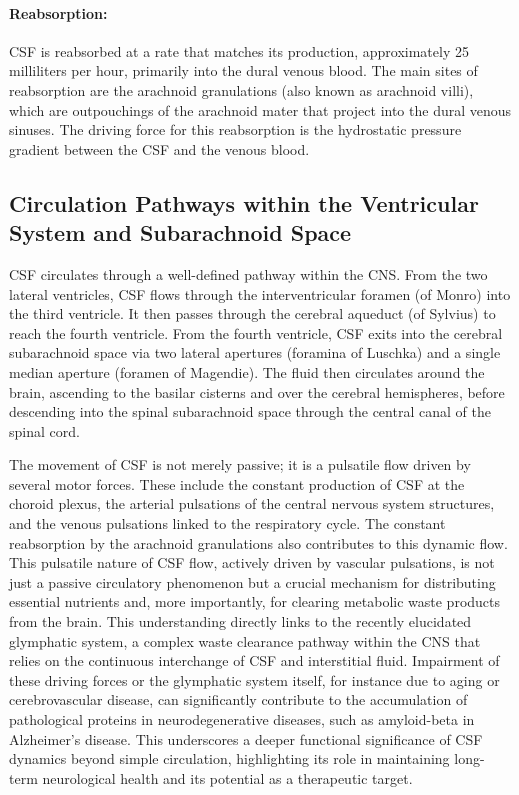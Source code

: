 \paragraph{Reabsorption:} CSF is reabsorbed at a rate that matches its production, approximately 25 milliliters per hour, primarily into the dural venous blood. The main sites of reabsorption are the arachnoid granulations (also known as arachnoid villi), which are outpouchings of the arachnoid mater that project into the dural venous sinuses. The driving force for this reabsorption is the hydrostatic pressure gradient between the CSF and the venous blood.
	
\subsection{Circulation Pathways within the Ventricular System and Subarachnoid Space}
	
CSF circulates through a well-defined pathway within the CNS. From the two lateral ventricles, CSF flows through the interventricular foramen (of Monro) into the third ventricle. It then passes through the cerebral aqueduct (of Sylvius) to reach the fourth ventricle. From the fourth ventricle, CSF exits into the cerebral subarachnoid space via two lateral apertures (foramina of Luschka) and a single median aperture (foramen of Magendie). The fluid then circulates around the brain, ascending to the basilar cisterns and over the cerebral hemispheres, before descending into the spinal subarachnoid space through the central canal of the spinal cord.
	
The movement of CSF is not merely passive; it is a pulsatile flow driven by several motor forces. These include the constant production of CSF at the choroid plexus, the arterial pulsations of the central nervous system structures, and the venous pulsations linked to the respiratory cycle. The constant reabsorption by the arachnoid granulations also contributes to this dynamic flow. This pulsatile nature of CSF flow, actively driven by vascular pulsations, is not just a passive circulatory phenomenon but a crucial mechanism for distributing essential nutrients and, more importantly, for clearing metabolic waste products from the brain. This understanding directly links to the recently elucidated glymphatic system, a complex waste clearance pathway within the CNS that relies on the continuous interchange of CSF and interstitial fluid. Impairment of these driving forces or the glymphatic system itself, for instance due to aging or cerebrovascular disease, can significantly contribute to the accumulation of pathological proteins in neurodegenerative diseases, such as amyloid-beta in Alzheimer's disease. This underscores a deeper functional significance of CSF dynamics beyond simple circulation, highlighting its role in maintaining long-term neurological health and its potential as a therapeutic target.
	
